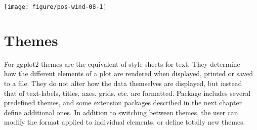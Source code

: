 \documentclass[krantz2]{krantz}\usepackage{knitr}%
\begin{document}
\begin{knitrout}\footnotesize
{}\color{fgcolor}\begin{kframe}
\begin{alltt}
  \hlopt{+}
  \hlstd{()} \hlopt{+}
  \hlstd{()} \hlopt{+}
  \hlstd{(} \hlstd{=} \hlstd{(}\hlstd{,} \hlstd{,} \hlstd{,} \hlstd{),}
                      \hlstd{=} \hlstd{(}\hlstd{,} \hlstd{,} \hlstd{,} \hlstd{),}
                      \hlstd{=} \hlstd{(}\hlstd{,} \hlstd{),}
                      \hlstd{=} \hlstd{(}\hlstd{,} \hlstd{),}
                      \hlstd{=} \hlstd{)} \hlopt{+}
  \hlstd{(} \hlstd{=} \hlstd{)} \hlopt{+}
  \hlstd{(}\hlopt{~}\hlstd{(}\hlstd{(} \hlopt{<} \hlstd{,} \hlstd{,} \hlstd{)))}
\end{alltt}
\end{kframe}

{\centering \texttt{[image: figure/pos-wind-08-1]} 

}



\end{knitrout}



\section{Themes}\label{sec:plot:themes}
For ggplot2 themes are the equivalent of style sheets for text. They determine how the different elements of a plot are rendered when displayed, printed or saved to a file. They do not alter how the data themselves are displayed, but instead that of text-labels, titles, axes, grids, etc. are formatted. Package \ggplot includes several predefined themes, and some extension packages described in the next chapter define additional ones. In addition to switching between themes, the user can modify the format applied to individual elements, or define totally new themes.
\end{document}
